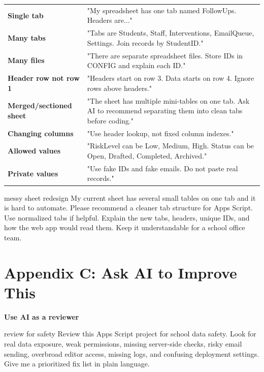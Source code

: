 \documentclass[10pt]{article}
\newcommand{\sectionkicker}[1]{\vspace{0.2em}{\small\bfseries\color{GCTeal}#1}\vspace{-0.15em}}
\newcommand{\tighttitle}[1]{{\Large\bfseries\color{GCNavy}#1}\par}
\begin{document}
\begin{longtable}{p{}p{}}
\textbf{Single tab} & "My spreadsheet has one tab named FollowUps. Headers are..." \\
\textbf{Many tabs} & "Tabs are Students, Staff, Interventions, EmailQueue, Settings. Join records by StudentID." \\
\textbf{Many files} & "There are separate spreadsheet files. Store IDs in CONFIG and explain each ID." \\
\textbf{Header row not row 1} & "Headers start on row 3. Data starts on row 4. Ignore rows above headers." \\
\textbf{Merged/sectioned sheet} & "The sheet has multiple mini-tables on one tab. Ask AI to recommend separating them into clean tabs before coding." \\
\textbf{Changing columns} & "Use header lookup, not fixed column indexes." \\
\textbf{Allowed values} & "RiskLevel can be Low, Medium, High. Status can be Open, Drafted, Completed, Archived." \\
\textbf{Private values} & "Use fake IDs and fake emails. Do not paste real records." \\
\end{longtable}

\begin{promptbox}{messy sheet redesign}
My current sheet has several small tables on one tab and it is hard to automate. Please recommend a cleaner tab structure for Apps Script. Use normalized tabs if helpful. Explain the new tabs, headers, unique IDs, and how the web app would read them. Keep it understandable for a school office team.
\end{promptbox}

\section{Appendix C: Ask AI to Improve This}
\sectionkicker{META-PROMPTS}
\tighttitle{Use AI as a reviewer}

\begin{promptbox}{review for safety}
Review this Apps Script project for school data safety. Look for real data exposure, weak permissions, missing server-side checks, risky email sending, overbroad editor access, missing logs, and confusing deployment settings. Give me a prioritized fix list in plain language.
\end{promptbox}
\end{document}
